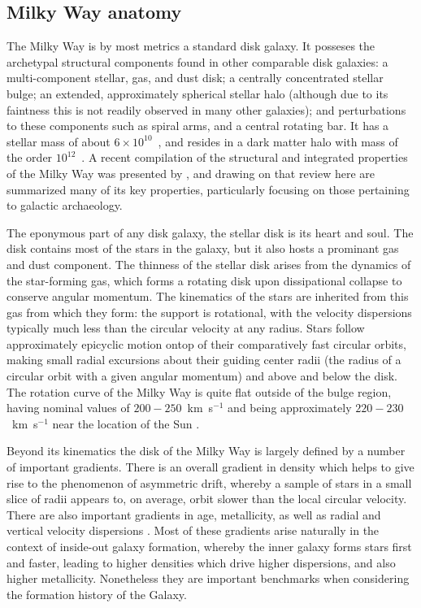 \subsection{Milky Way anatomy}

The Milky Way is by most metrics a standard disk galaxy. It posseses the archetypal structural components found in other comparable disk galaxies: a multi-component stellar, gas, and dust disk; a centrally concentrated stellar bulge; an extended, approximately spherical stellar halo (although due to its faintness this is not readily observed in many other galaxies); and perturbations to these components such as spiral arms, and a central rotating bar. It has a stellar mass of about $6\times10^{10}$~\Msun, and resides in a dark matter halo with mass of the order $10^{12}$~\Msun.  A recent compilation of the structural and integrated properties of the Milky Way was presented by \textcite{bland-hawthorn16}, and drawing on that review here are summarized many of its key properties, particularly focusing on those pertaining to galactic archaeology.

The eponymous part of any disk galaxy, the stellar disk is its heart and soul. The disk contains most of the stars in the galaxy, but it also hosts a prominant gas and dust component. The thinness of the stellar disk arises from the dynamics of the star-forming gas, which forms a rotating disk upon dissipational collapse to conserve angular momentum. The kinematics of the stars are inherited from this gas from which they form: the support is rotational, with the velocity dispersions typically much less than the circular velocity at any radius. Stars follow approximately epicyclic motion ontop of their comparatively fast circular orbits, making small radial excursions about their guiding center radii (the radius of a circular orbit with a given angular momentum) and above and below the disk. The rotation curve of the Milky Way is quite flat outside of the bulge region, having nominal values of $200-250$~km~s$^{-1}$ and being approximately $220-230$~km~s$^{-1}$ near the location of the Sun \parencite[e.g.][]{bovy12a,eilers19}.

Beyond its kinematics the disk of the Milky Way is largely defined by a number of important gradients. There is an overall gradient in density \parencite[equivalently luminosity, as in other galaxies per e.g.][]{freeman70} which helps to give rise to the phenomenon of asymmetric drift, whereby a sample of stars in a small slice of radii appears to, on average, orbit slower than the local circular velocity. There are also important gradients in age, metallicity, as well as radial and vertical velocity dispersions \parencite[e.g.][]{bovy12d,bovy16b,mackereth19a}. Most of these gradients arise naturally in the context of inside-out galaxy formation, whereby the inner galaxy forms stars first and faster, leading to higher densities which drive higher dispersions, and also higher metallicity. Nonetheless they are important benchmarks when considering the formation history of the Galaxy.

